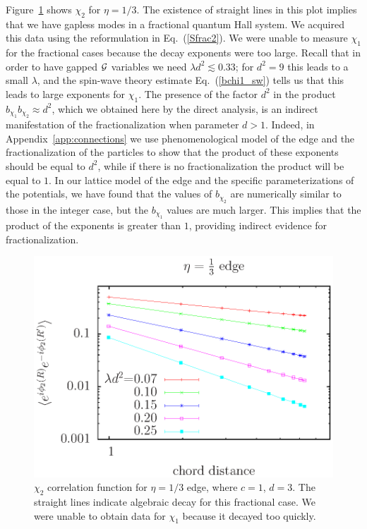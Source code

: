Figure~\ref{onethird} shows $\chi_2$ for $\eta=1/3$. The existence of straight lines in this plot implies that we have gapless modes in a fractional quantum Hall system. We acquired this data using the reformulation in Eq.~(\ref{Sfrac2}). We were unable to measure $\chi_1$ for the fractional cases because the decay exponents were too large. Recall that in order to have gapped $\cal{G}$ variables we need $\lambda d^2 \lesssim 0.33$; for $d^2=9$ this leads to a small $\lambda$, and the spin-wave theory estimate Eq.~(\ref{bchi1_sw}) tells us that this leads to large exponents for $\chi_1$.  The presence of the factor $d^2$ in the product $b_{\chi_1} b_{\chi_2} \approx d^2$, which we obtained here by the direct analysis, is an indirect manifestation of the fractionalization when parameter $d>1$.  Indeed, in Appendix~\ref{app:connections} we use phenomenological model of the edge and the fractionalization of the particles to show that the product of these exponents should be equal to $d^2$, while if there is no fractionalization the product will be equal to $1$. In our lattice model of the edge and the specific parameterizations of the potentials, we have found that the values of $b_{\chi_2}$ are numerically similar to those in the integer case, but the $b_{\chi_1}$ values are much larger. This implies that the product of the exponents is greater than $1$, providing indirect evidence for fractionalization.

\begin{figure}
\includegraphics[width=\linewidth]{figures/thirdcord.eps}
\caption{ $\chi_2$ correlation function for $\eta=1/3$ edge, where $c=1$, $d=3$. The straight lines indicate algebraic decay for this fractional case. We were unable to obtain data for $\chi_1$ because it decayed too quickly.
\label{onethird}}
\end{figure}


